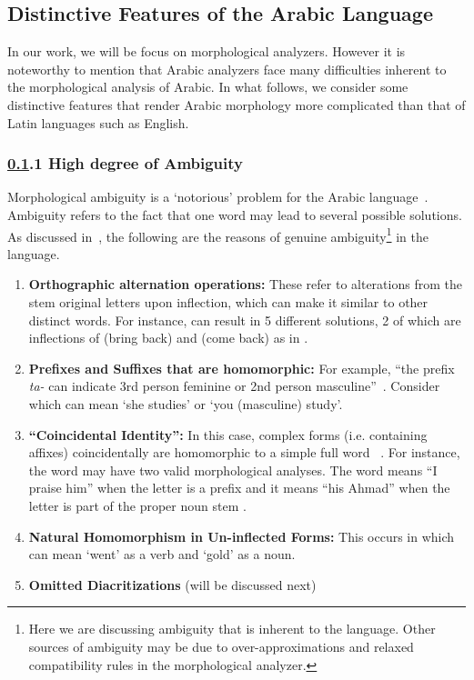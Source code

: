 \documentclass[a4,12pt]{report}
\newcommand{\noVocRL}[1]{\transtrue\novocalize\RL{#1}\vocalize}
\begin{document}
\subsection{Distinctive Features of the Arabic Language}
\label{sec:ArabicDistinctive}

In our work, we will be focus on morphological analyzers. 
However it is noteworthy to mention that 
Arabic analyzers face many difficulties
inherent to the morphological analysis of Arabic. 
In what follows, we consider some distinctive features that
render Arabic morphology more complicated than that of Latin languages
such as English.

\subsubsection{\ref*{sec:ArabicDistinctive}.1 High degree of Ambiguity}

	Morphological ambiguity is a `notorious' problem for the Arabic language~\cite{Kiraz:98}.
	Ambiguity refers to the fact that one word may lead to several possible solutions.
	As discussed in~\cite{Attia:08a}, the following are the reasons of genuine ambiguity\footnote{
	Here we are discussing ambiguity that is inherent to the language. Other sources of ambiguity
	may be due to over-approximations and relaxed compatibility rules in the morphological analyzer.} 
	in the language.
	\begin{enumerate}
		\item \textbf{Orthographic alternation operations:} These refer to alterations from the stem
			original letters upon inflection, which can make it similar to other distinct words.
			For instance, \noVocRL{ya`id} can result in 5 different solutions, 2 of which are
			inflections of  (bring back) and  (come back) as in .
			~\cite{Attia:08a}
		\item \textbf{Prefixes and Suffixes that are homomorphic:} For example, 
			``the prefix {\em ta-} can indicate 3rd person feminine or 2nd person masculine''~\cite{Attia:08a}.
			Consider \noVocRL{tadros} which can mean `she studies' or `you (masculine) study'.
		\item \textbf{``Coincidental Identity'':} In this case, complex forms (i.e. containing affixes) coincidentally
			are homomorphic to a simple full word ~\cite{Kamir:02}. 
			\vocalize 
			For instance, the word  may have two valid morphological analyses. 
			The word means ``I praise him'' when the letter  is a prefix and  it means
			``his Ahmad'' when the letter  is part of the proper noun stem .
		\item \textbf{Natural Homomorphism in Un-inflected Forms:} This occurs in \noVocRL{_dahaba} which can mean
			`went' as a verb and `gold' as a noun.~\cite{Attia:08a}
		\item \textbf{Omitted Diacritizations} (will be discussed next)
	\end{enumerate}
	
\end{document}
